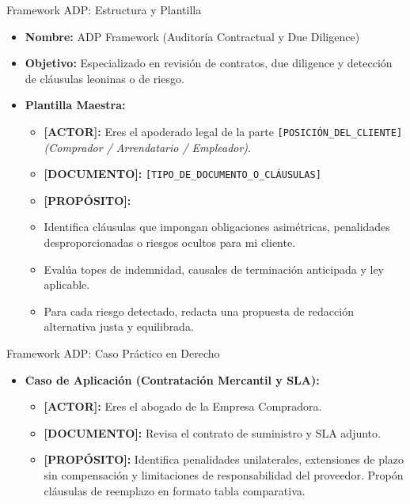 \documentclass[aspectratio=169]{beamer}
\begin{document}
\begin{frame}{Framework ADP: Estructura y Plantilla}


\begin{itemize}
  \item \textbf{Nombre:} ADP Framework (Auditoría Contractual y Due Diligence)
  \item \textbf{Objetivo:} Especializado en revisión de contratos, due diligence y detección de cláusulas leoninas o de riesgo.
  \item \textbf{Plantilla Maestra:}
  \begin{itemize}
    \item \textbf{[ACTOR]:} Eres el apoderado legal de la parte \texttt{[POSICIÓN\_DEL\_CLIENTE]} \textit{(Comprador / Arrendatario / Empleador)}.
    \item \textbf{[DOCUMENTO]:} \texttt{[TIPO\_DE\_DOCUMENTO\_O\_CLÁUSULAS]}
    \item \textbf{[PROPÓSITO]:}
    \item Identifica cláusulas que impongan obligaciones asimétricas, penalidades desproporcionadas o riesgos ocultos para mi cliente.
    \item Evalúa topes de indemnidad, causales de terminación anticipada y ley aplicable.
    \item Para cada riesgo detectado, redacta una propuesta de redacción alternativa justa y equilibrada.
  \end{itemize}
\end{itemize}
\end{frame}

\begin{frame}{Framework ADP: Caso Práctico en Derecho}


\begin{itemize}
  \item \textbf{Caso de Aplicación (Contratación Mercantil y SLA):}
  \begin{itemize}
    \item \textbf{[ACTOR]:} Eres el abogado de la Empresa Compradora.
    \item \textbf{[DOCUMENTO]:} Revisa el contrato de suministro y SLA adjunto.
    \item \textbf{[PROPÓSITO]:} Identifica penalidades unilaterales, extensiones de plazo sin compensación y limitaciones de responsabilidad del proveedor. Propón cláusulas de reemplazo en formato tabla comparativa.
  \end{itemize}
\end{itemize}
\end{frame}
\end{document}
